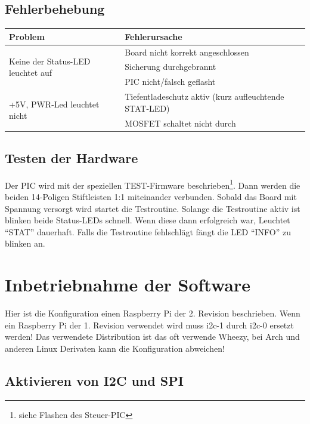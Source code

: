 \documentclass[a4paper,10pt]{article}
\begin{document}
\subsection{Fehlerbehebung}

\begin{center}
    \begin{tabular}{| l | p{6cm} |}
    \hline
    \textbf{Problem}	& \textbf{Fehlerursache} \\ \hline
    \multirow{3}{*}{Keine der Status-LED leuchtet auf}
	& Board nicht korrekt angeschlossen \\ \cline{2-2}
	& Sicherung durchgebrannt \\ \cline{2-2}
	& PIC nicht/falsch geflasht \\
    \hline
    \multirow{2}{*}{+5V, PWR-Led leuchtet nicht}
	& Tiefentladeschutz aktiv (kurz aufleuchtende STAT-LED) \\ \cline{2-2}
	& MOSFET schaltet nicht durch \\
    \hline
    \end{tabular}
\end{center}

\subsection{Testen der Hardware}

Der PIC wird mit der speziellen TEST-Firmware beschrieben\footnote{siehe Flashen des Steuer-PIC}. Dann werden die beiden 14-Poligen Stiftleisten 1:1 miteinander verbunden. Sobald das Board mit Spannung versorgt wird startet die Testroutine. Solange die Testroutine aktiv ist blinken beide Status-LEDs schnell. Wenn diese dann erfolgreich war, Leuchtet ``STAT'' dauerhaft. Falls die Testroutine fehlschlägt fängt die LED ``INFO'' zu blinken an.

\newpage

\section{Inbetriebnahme der Software}

Hier ist die Konfiguration einen Raspberry Pi der 2. Revision beschrieben. Wenn ein Raspberry Pi der 1. Revision verwendet wird muss i2c-1 durch i2c-0 ersetzt werden! Das verwendete Distribution ist das oft verwende Wheezy, bei Arch und anderen Linux Derivaten kann die Konfiguration abweichen!

\subsection{Aktivieren von I2C und SPI}
\end{document}
